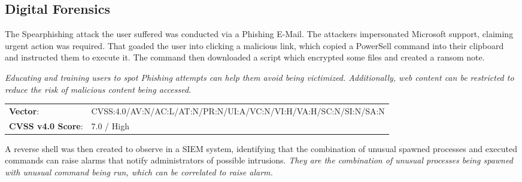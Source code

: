 \documentclass[../report.tex]{subfiles}
\begin{document}
\subsection{Digital Forensics}

The Spearphishing attack the user suffered was conducted via a Phishing E-Mail.
The attackers impersonated Microsoft support, claiming urgent action was required.
That goaded the user into clicking a malicious link, which copied a PowerSell command into their clipboard and instructed them to execute it.
The command then downloaded a script which encrypted some files and created a ransom note.

\textit{Educating and training users to spot Phishing attempts can help them avoid being victimized. Additionally, web content can be restricted to reduce the risk of malicious content being accessed.}

\begin{tabular}{l l}
\textbf{Vector}: & CVSS:4.0/AV:N/AC:L/AT:N/PR:N/UI:A/VC:N/VI:H/VA:H/SC:N/SI:N/SA:N\\
\textbf{CVSS v4.0 Score}: & 7.0 / High
\end{tabular}

A reverse shell was then created to observe in a SIEM system, identifying that the combination of unusual spawned processes and executed commands can raise alarms that notify administrators of possible intrusions. \textit{They are the combination of unusual processes being spawned with unusual command being run, which can be correlated to raise alarm.}
\end{document}
